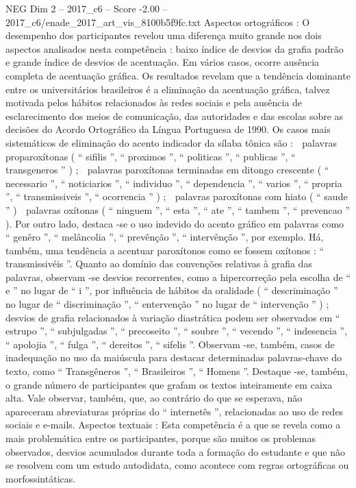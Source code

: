 \begin{textsample}{NEG Dim 2 – 2017\_c6 – Score -2.00 – 2017\_c6/enade\_2017\_art\_vis\_8100b5f9fc.txt}
Aspectos ortográficos : O desempenho dos participantes revelou uma diferença muito grande nos dois aspectos analisados nesta competência : baixo índice de desvios da grafia padrão e grande índice de desvios de acentuação.
Em vários casos, ocorre ausência completa de acentuação gráfica.
Os resultados revelam que a tendência dominante entre os universitários brasileiros é a eliminação da acentuação gráfica, talvez motivada pelos hábitos relacionados às redes sociais e pela ausência de esclarecimento dos meios de comunicação, das autoridades e das escolas sobre as decisões do Acordo Ortográfico da Língua Portuguesa de 1990.
Os casos mais sistemáticos de eliminação do acento indicador da sílaba tônica são :  palavras proparoxítonas ( “ sifilis ”, “ proximos ”, “ politicas ”, “ publicas ”, “ transgeneros ” ) ;  palavras paroxítonas terminadas em ditongo crescente ( “ necessario ”, “ noticiarios ”, “ individuo ”, “ dependencia ”, “ varios ”, “ propria ”, “ transmissiveis ”, “ ocorrencia ” ) ;  palavras paroxítonas com hiato ( “ saude ” )  palavras oxítonas ( “ ninguem ”, “ esta ”, “ ate ”, “ tambem ”, “ prevencao ” ).
Por outro lado, destaca -se o uso indevido do acento gráfico em palavras como “ genêro ”, “ melâncolia ”, “ prevênção ”, “ intervênção ”, por exemplo.
Há, também, uma tendência a acentuar paroxítonos como se fossem oxítonos : “ transmissivéis ”.
Quanto ao domínio das convenções relativas à grafia das palavras, observam -se desvios recorrentes, como a hipercorreção pela escolha de “ e ” no lugar de “ i ”, por influência de hábitos da oralidade ( “ descriminação ” no lugar de “ discriminação ”, “ entervenção ” no lugar de “ intervenção ” ) ; desvios de grafia relacionados à variação diastrática podem ser observados em “ estrupo ”, “ subjulgadas ”, “ precoseito ”, “ soubre ”, “ vecendo ”, “ indesencia ”, “ apolojia ”, “ fulga ”, “ dereitos ”, “ sifelis ”.
Observam -se, também, casos de inadequação no uso da maiúscula para destacar determinadas palavras-chave do texto, como “ Transgêneros ”, “ Brasileiros ”, “ Homens ”.
Destaque -se, também, o grande número de participantes que grafam os textos inteiramente em caixa alta.
Vale observar, também, que, ao contrário do que se esperava, não apareceram abreviaturas próprias do “ internetês ”, relacionadas ao uso de redes sociais e e-mails.
Aspectos textuais : Esta competência é a que se revela como a mais problemática entre os participantes, porque são muitos os problemas observados, desvios acumulados durante toda a formação do estudante e que não se resolvem com um estudo autodidata, como acontece com regras ortográficas ou morfossintáticas.

\end{textsample}
